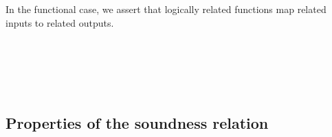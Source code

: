 \documentclass[authoryear, acmsmall, screen, review, nonacm]{acmart}
\begin{document}
In the functional case, we assert that logically related functions map related inputs to related outputs.

\begin{code}%
\>[0]\AgdaSpace{}%
\AgdaSymbol{\{}\AgdaSymbol{\}}\AgdaSpace{}%
\AgdaSymbol{\{}\AgdaSpace{}%
\AgdaSymbol{=}\AgdaSpace{}%
\AgdaSpace{}%
\AgdaSpace{}%
\AgdaSymbol{\}}\AgdaSpace{}%
\AgdaSpace{}%
\AgdaSpace{}%
\AgdaSymbol{=}\AgdaSpace{}%
\AgdaSpace{}%
\AgdaSpace{}%
\<%
\\
\>[0]\AgdaSpace{}%
\AgdaSymbol{\{}\AgdaSpace{}%
\AgdaSymbol{=}\AgdaSpace{}%
\AgdaSymbol{\}}\AgdaSpace{}%
\AgdaSymbol{\{}\AgdaSpace{}%
\AgdaSymbol{=}\AgdaSpace{}%
\AgdaSymbol{\}}\AgdaSpace{}%
\AgdaSymbol{\{}\AgdaSpace{}%
\AgdaSymbol{=}\AgdaSpace{}%
\AgdaSymbol{\}}\AgdaSpace{}%
\AgdaSpace{}%
\AgdaSpace{}%
\AgdaSymbol{=}\<%
\\
\>[0][@{}l@{\AgdaIndent{0}}]%
\>[4]\AgdaSpace{}%
\AgdaSymbol{\{}\AgdaSymbol{\}}\AgdaSpace{}%
\AgdaSymbol{(}\AgdaSpace{}%
\AgdaSymbol{:}\AgdaSpace{}%
\AgdaSpace{}%
\AgdaSpace{}%
\AgdaSymbol{)}\AgdaSpace{}%
\AgdaSymbol{\{}\AgdaSpace{}%
\AgdaSymbol{\}}\AgdaSpace{}%
\<%
\\
\>[4][@{}l@{\AgdaIndent{0}}]%
\>[6]\AgdaSpace{}%
\AgdaSpace{}%
\AgdaSpace{}%
\AgdaSpace{}%
\<%
\\
%
\>[6]\AgdaSpace{}%
\AgdaSymbol{(}\AgdaSpace{}%
\AgdaSpace{}%
\AgdaSpace{}%
\AgdaSpace{}%
\AgdaSymbol{)}\AgdaSpace{}%
\AgdaSpace{}%
\AgdaSymbol{(}\AgdaSpace{}%
\AgdaSpace{}%
\AgdaSpace{}%
\AgdaSpace{}%
\AgdaSymbol{))}\<%
\end{code}

\subsection{Properties of the soundness relation}
\end{document}
